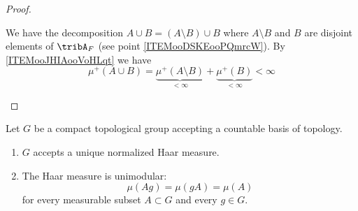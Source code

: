 \begin{proof}
\begin{subproof}
            We have the decomposition \( A\cup B=(A\setminus B)\cup B\) where \( A\setminus B\) and \( B\) are disjoint elements of \( \tribA_F\) (see point \ref{ITEMooDSKEooPQmrcW}). By \ref{ITEMooJHIAooVoHLqt} we have
            \begin{equation}
                \mu^+(A\cup B)=\underbrace{\mu^+(A\setminus B)}_{<\infty}+ \underbrace{\mu^+(B)}_{<\infty}<\infty
            \end{equation}
    \end{subproof}
\end{proof}



\begin{theorem} \label{ThoBZBooOTxqcI}
    Let \( G\) be a compact topological group accepting a countable basis of topology.
    \begin{enumerate}
        \item
            \( G\) accepts a unique normalized Haar measure.
        \item
            The Haar measure is unimodular:
	\begin{equation}
		\mu(Ag)=\mu(gA)=\mu(A)
	\end{equation}
    for every measurable subset \( A\subset G\) and every \( g\in G\).
    \end{enumerate}
\end{theorem}


